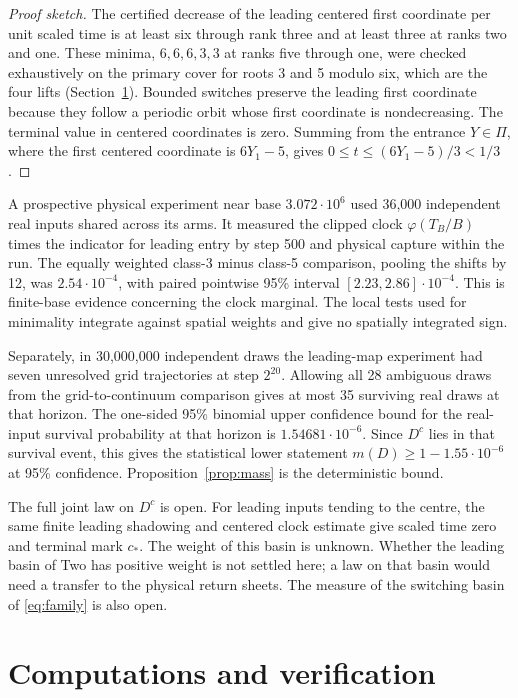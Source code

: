 \documentclass[11pt,reqno]{amsart}
\theoremstyle{definition}
\newcommand{\cen}{c_*}
\begin{document}
\begin{proof}[Proof sketch]
The certified decrease of the leading centered first coordinate per unit
scaled time is at least six through rank three and at least three at
ranks two and one. These minima, \(6,6,6,3,3\) at ranks five through one,
were checked exhaustively on the primary cover for roots 3 and 5 modulo
six, which are the four lifts (Section~\ref{sec:verification}). Bounded
switches preserve the leading first coordinate because they follow a
periodic orbit whose first coordinate is nondecreasing. The terminal
value in centered coordinates is zero. Summing from the entrance
\(Y\in\Pi\), where the first centered coordinate is \(6Y_1-5\), gives
\(0\le t\le(6Y_1-5)/3<1/3\).
\end{proof}

A prospective physical experiment near base \(3.072\cdot10^6\)
used 36,000 independent real inputs shared across its arms. It measured
the clipped clock \(\varphi(T_B/B)\) times the indicator for leading entry by
step 500 and physical capture within the run. The equally weighted
class-3 minus class-5 comparison, pooling the shifts by 12, was
\(2.54\cdot10^{-4}\), with paired pointwise 95\% interval
\([2.23,2.86]\cdot10^{-4}\). This is finite-base evidence concerning
the clock marginal. The local tests used for minimality integrate
against spatial weights and give no spatially integrated sign.

Separately, in 30,000,000 independent draws the leading-map experiment
had seven unresolved grid trajectories at step \(2^{20}\).
Allowing all 28 ambiguous draws from the grid-to-continuum comparison
gives at most 35 surviving real draws at that horizon. The
one-sided 95\% binomial upper confidence bound for the real-input
survival probability at that horizon is \(1.54681\cdot10^{-6}\).
Since \(D^c\) lies in that survival event, this gives the statistical
lower statement \(m(D)\ge1-1.55\cdot10^{-6}\) at 95\% confidence.
Proposition~\ref{prop:mass} is the deterministic bound.

The full joint law on \(D^c\) is open. For leading inputs tending to
the centre, the same finite leading shadowing and centered clock
estimate give scaled time zero and terminal mark \(\cen\). The
weight of this basin is unknown. Whether the leading basin of Two has
positive weight is not settled here; a law on that basin would need a
transfer to the physical return sheets. The measure of the switching
basin of \eqref{eq:family} is also open.

\section{Computations and verification}\label{sec:verification}
\end{document}
